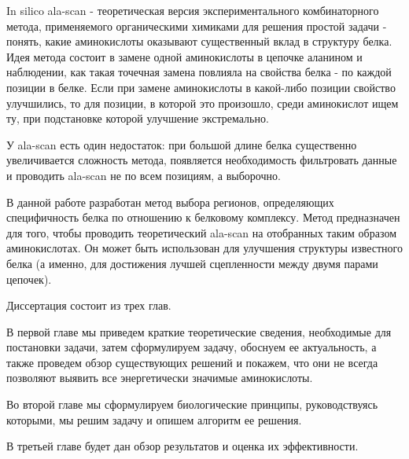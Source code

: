 \intro

In silico ala-scan - теоретическая версия экспериментального комбинаторного метода, применяемого органическими химиками для решения простой задачи - понять, какие аминокислоты оказывают существенный вклад в структуру белка. Идея метода состоит в замене одной аминокислоты в цепочке аланином и наблюдении, как такая точечная замена повлияла на свойства белка - по каждой позиции в белке. Если при замене аминокислоты в какой-либо позиции свойство улучшились, то для позиции, в которой это произошло, среди аминокислот ищем ту, при подстановке которой улучшение экстремально.

У ala-scan есть один недостаток: при большой длине белка существенно увеличивается сложность метода, появляется необходимость фильтровать данные и проводить ala-scan не по всем позициям, а выборочно.

В данной работе разработан метод выбора регионов, определяющих специфичность белка по отношению к белковому комплексу. Метод предназначен для того, чтобы проводить теоретический ala-scan на отобранных таким образом аминокислотах. Он может быть использован для улучшения структуры известного белка (а именно, для достижения лучшей сцепленности между двумя парами цепочек). 

Диссертация состоит из трех глав. 

В первой главе мы приведем краткие теоретические сведения, необходимые
для постановки задачи, затем сформулируем задачу, обоснуем ее актуальность, а
также проведем обзор существующих решений и покажем, что они не всегда позволяют выявить все энергетически значимые аминокислоты.

Во второй главе мы сформулируем биологические принципы, руководствуясь которыми, мы решим задачу и опишем алгоритм ее решения.

В третьей главе будет дан обзор результатов и оценка их эффективности.

